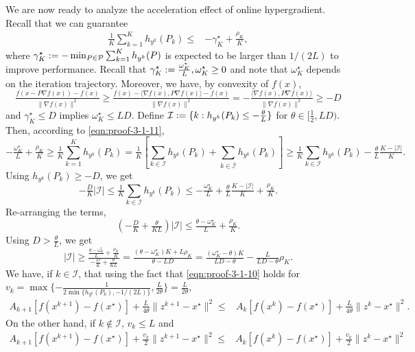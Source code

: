 We are now ready to analyze the acceleration effect of online hypergradient. Recall that we can guarantee
\begin{align}
  \tfrac{1}{K}\textstyle \sum_{k = 1}^K h_{y^k} (P_k) \leq & - \gamma^{\star}_K +
  \tfrac{\rho_K}{K}, \label{eqn:proof-3-1-11}
\end{align}
where $\gamma^{\star}_K := -\min_{P \in \mathcal{P}} \sum_{k = 1}^K h_{y^k} (P)$ is expected to be larger than $1 / (2 L)$ to improve
performance. Recall that $\gamma^{\star}_K :=
\tfrac{\omega^\star_K}{L}, \omega^\star_K \geq 0$ and note that $\omega^\star_K$ depends on the
iteration trajectory. Moreover, we have, by convexity of $f (x)$,
\[ \tfrac{f (x - P \nabla f (x)) - f (x)}{\| \nabla f (x) \|^2} \geq \tfrac{f
   (x) - \langle \nabla f (x), P \nabla f (x) \rangle - f (x)}{\| \nabla f (x)
   \|^2} = - \tfrac{\langle \nabla f (x), P \nabla f (x) \rangle}{\| \nabla f
   (x) \|^2} \geq - D \]
and $\gamma^{\star}_K \leq D$ implies $\omega^\star_K \leq L D$. Define $\mathcal{I}
:= \{ k : h_{y^k} (P_k) \leq - \tfrac{\theta}{L} \}$ for
$\theta \in [\tfrac{1}{2}, L D)$. Then, according to \eqref{eqn:proof-3-1-11}, 
\[ \textstyle - \tfrac{\omega^\star_K}{L} + \tfrac{\rho_K}{K} \geq \tfrac{1}{K} \sum_{k = 1}^K
   h_{y^k} (P_k) = \tfrac{1}{K} [ \sum_{k \in \mathcal{I}} h_{y^k} (P_k)
   + \sum_{k \in \bar{\mathcal{I}}} h_{y^k} (P_k) ] \geq \tfrac{1}{K}
   \sum_{k \in \mathcal{I}} h_{y^k} (P_k) - \tfrac{\theta}{L} \tfrac{K - |
   \mathcal{I} |}{K} . \]
Using $h_{y^k} (P_k) \geq - D$, we get
\[ \textstyle- \tfrac{D}{K} | \mathcal{I} | \leq \tfrac{1}{K} \sum_{k \in \mathcal{I}}
   h_{y^k} (P_k) \leq - \tfrac{\omega^\star_K}{L} + \tfrac{\theta}{L} \tfrac{K - |
   \mathcal{I} |}{K} + \tfrac{\rho_K}{K} . \]
Re-arranging the terms,
\[ ( - \tfrac{D}{K} + \tfrac{\theta}{K L} ) | \mathcal{I} | \leq
   \tfrac{\theta - \omega^\star_K}{L} + \tfrac{\rho_K}{K} . \]
Using $D > \tfrac{\theta}{L}$, we get
\[ | \mathcal{I} | \geq \tfrac{\tfrac{\theta - \omega^\star_K}{L} +
   \tfrac{\rho_K}{K}}{- \tfrac{D}{K} + \tfrac{\theta}{K L}} = \tfrac{(\theta -
   \omega^\star_K) K + L \rho_K}{\theta - L D} = \tfrac{(\omega^\star_K - \theta) K}{L D -
   \theta} - \tfrac{L}{L D - \theta} \rho_K . \]
We have, if $k \in \mathcal{I}$, that using the fact that \eqref{eqn:proof-3-1-10} holds for $v_k = \max \{ - \tfrac{1}{2 \min \{ h_{y^k} (P_k), - 1 / (2 L) \}},
   \tfrac{L}{2 \theta} \}  = \tfrac{L}{2 \theta}$,
\begin{align}
  A_{k + 1} [f (x^{k + 1}) - f (x^{\star})] + \tfrac{L}{4 \theta} \| z^{k + 1}
  - x^{\star} \|^2 \leq{} & A_k [f (x^k) - f (x^{\star})] + \tfrac{L}{4 \theta}
  \| z^k - x^{\star} \|^2. \label{eqn:proof-3-1-12}
\end{align}
On the other hand, if $k \nin \mathcal{I}$, $v_k \leq L$ and 
\begin{align}
  A_{k + 1} [f (x^{k + 1}) - f (x^{\star})] + \tfrac{v_k}{2} \| z^{k + 1} -
  x^{\star} \|^2 \leq{} & A_k [f (x^k) - f (x^{\star})] + \tfrac{v_k}{2} \| z^k -
  x^{\star} \|^2 \label{eqn:proof-3-1-13}
\end{align}

